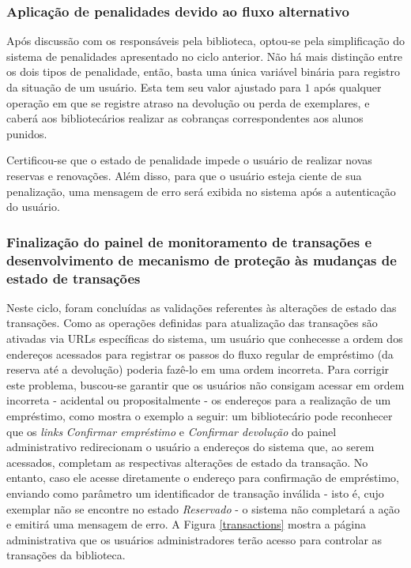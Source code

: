 \documentclass[a4paper]{article}
\begin{document}
\subsubsection{Aplicação de penalidades devido ao fluxo alternativo}
    
Após discussão com os responsáveis pela biblioteca, optou-se pela simplificação do sistema de penalidades apresentado no ciclo anterior. Não há mais distinção entre os dois tipos de penalidade, então, basta uma única variável binária para registro da situação de um usuário. Esta tem seu valor ajustado para $1$ após qualquer operação em que se registre atraso na devolução ou perda de exemplares, e caberá aos bibliotecários realizar as cobranças correspondentes aos alunos punidos.
    
Certificou-se que o estado de penalidade impede o usuário de realizar novas reservas e renovações. Além disso, para que o usuário esteja ciente de sua penalização, uma mensagem de erro será exibida no sistema após a autenticação do usuário. 

\subsubsection{Finalização do painel de monitoramento de transações e desenvolvimento de mecanismo de proteção às mudanças de estado de transações}\label{sssec:stransaction2}
    
Neste ciclo, foram concluídas as validações referentes às alterações de estado das transações. Como as operações definidas para atualização das transações são ativadas via URLs específicas do sistema, um usuário que conhecesse a ordem dos endereços acessados para registrar os passos do fluxo regular de empréstimo (da reserva até a devolução) poderia fazê-lo em uma ordem incorreta. Para corrigir este problema, buscou-se garantir que os usuários não consigam acessar em ordem incorreta - acidental ou propositalmente - os endereços para a realização de um empréstimo, como mostra o exemplo a seguir: um bibliotecário pode reconhecer que os \textit{links} \textit{Confirmar empréstimo} e \textit{Confirmar devolução} do painel administrativo redirecionam o usuário a endereços do sistema que, ao serem acessados, completam as respectivas alterações de estado da transação. No entanto, caso ele acesse diretamente o endereço para confirmação de empréstimo, enviando como parâmetro um identificador de transação inválida - isto é, cujo exemplar não se encontre no estado \textit{Reservado} - o sistema não completará a ação e emitirá uma mensagem de erro. A Figura \ref{transactions} mostra a página administrativa que os usuários administradores terão acesso para controlar as transações da biblioteca.
\end{document}
